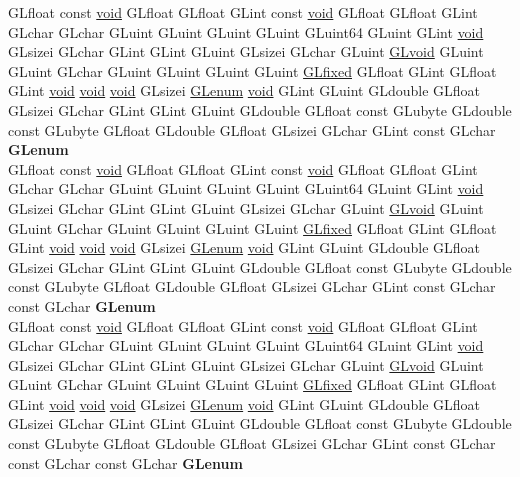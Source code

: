 \begin{DoxyCompactItemize}
\begin{tabbing}
\>GLfloat const \hyperlink{interfacevoid}{void} GLfloat GLfloat GLint const \hyperlink{interfacevoid}{void} GLfloat GLfloat GLint GLchar GLchar GLuint GLuint GLuint GLuint GLuint64 GLuint GLint \hyperlink{interfacevoid}{void} GLsizei GLchar GLint GLint GLuint GLsizei GLchar GLuint \hyperlink{interfacevoid}{GLvoid} GLuint GLuint GLchar GLuint GLuint GLuint GLuint \hyperlink{glheader_8h_ad6d3fa892df40dedf48ee6d84529ae5e}{GLfixed} GLfloat GLint GLfloat GLint \hyperlink{interfacevoid}{void} \hyperlink{interfacevoid}{void} \hyperlink{interfacevoid}{void} GLsizei \hyperlink{interfacevoid}{GLenum} \hyperlink{interfacevoid}{void} GLint GLuint GLdouble GLfloat GLsizei GLchar GLint GLint GLuint GLdouble GLfloat const GLubyte GLdouble const GLubyte GLfloat GLdouble GLfloat GLsizei GLchar GLint const GLchar {\bfseries GLenum}\\
\>GLfloat const \hyperlink{interfacevoid}{void} GLfloat GLfloat GLint const \hyperlink{interfacevoid}{void} GLfloat GLfloat GLint GLchar GLchar GLuint GLuint GLuint GLuint GLuint64 GLuint GLint \hyperlink{interfacevoid}{void} GLsizei GLchar GLint GLint GLuint GLsizei GLchar GLuint \hyperlink{interfacevoid}{GLvoid} GLuint GLuint GLchar GLuint GLuint GLuint GLuint \hyperlink{glheader_8h_ad6d3fa892df40dedf48ee6d84529ae5e}{GLfixed} GLfloat GLint GLfloat GLint \hyperlink{interfacevoid}{void} \hyperlink{interfacevoid}{void} \hyperlink{interfacevoid}{void} GLsizei \hyperlink{interfacevoid}{GLenum} \hyperlink{interfacevoid}{void} GLint GLuint GLdouble GLfloat GLsizei GLchar GLint GLint GLuint GLdouble GLfloat const GLubyte GLdouble const GLubyte GLfloat GLdouble GLfloat GLsizei GLchar GLint const GLchar const GLchar {\bfseries GLenum}\\
\>GLfloat const \hyperlink{interfacevoid}{void} GLfloat GLfloat GLint const \hyperlink{interfacevoid}{void} GLfloat GLfloat GLint GLchar GLchar GLuint GLuint GLuint GLuint GLuint64 GLuint GLint \hyperlink{interfacevoid}{void} GLsizei GLchar GLint GLint GLuint GLsizei GLchar GLuint \hyperlink{interfacevoid}{GLvoid} GLuint GLuint GLchar GLuint GLuint GLuint GLuint \hyperlink{glheader_8h_ad6d3fa892df40dedf48ee6d84529ae5e}{GLfixed} GLfloat GLint GLfloat GLint \hyperlink{interfacevoid}{void} \hyperlink{interfacevoid}{void} \hyperlink{interfacevoid}{void} GLsizei \hyperlink{interfacevoid}{GLenum} \hyperlink{interfacevoid}{void} GLint GLuint GLdouble GLfloat GLsizei GLchar GLint GLint GLuint GLdouble GLfloat const GLubyte GLdouble const GLubyte GLfloat GLdouble GLfloat GLsizei GLchar GLint const GLchar const GLchar const GLchar {\bfseries GLenum}\\

\end{tabbing}
\end{DoxyCompactItemize}
